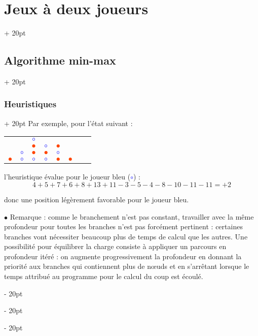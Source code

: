 \documentclass[a4paper, 12pt, twoside]{article}
\newcommand{\ind}[1][20pt]{\advance\leftskip + #1}
\newcommand{\deind}[1][20pt]{\advance\leftskip - #1}
\newenvironment{indt}[2][20pt]{#2 \par \ind[#1]}{\par \deind} %
\begin{document}
\begin{indt}{\section{Jeux à deux joueurs}}
\begin{indt}{\subsection{Algorithme min-max}}
\begin{indt}{\subsubsection{Heuristiques}}
                Par exemple, pour l'état suivant :
                \begin{center}
                    \begin{tabular}{|c|c|c|c|c|c|c|}
                        &
                        & \textcolor{blue}{$\circ$}
                        &&&&
                        \\
                        &
                        & \textcolor{ff4500}{$\bullet$}
                        & \textcolor{blue}{$\circ$}
                        & \textcolor{ff4500}{$\bullet$}
                        &&
                        \\
                        & \textcolor{blue}{$\circ$}
                        & \textcolor{ff4500}{$\bullet$}
                        & \textcolor{ff4500}{$\bullet$}
                        & \textcolor{blue}{$\circ$}
                        &&
                        \\
                        \textcolor{ff4500}{$\bullet$}
                        & \textcolor{blue}{$\circ$}
                        & \textcolor{blue}{$\circ$}
                        & \textcolor{blue}{$\circ$}
                        & \textcolor{ff4500}{$\bullet$}
                        & \textcolor{ff4500}{$\bullet$}
                        & $\phantom{\bullet}$
                        \\
                        \hline
                    \end{tabular}
                \end{center}

                l'heuristique évalue pour le joueur bleu (\textcolor{blue}{$\circ$}) :
                \[
                    4 + 5 + 7 + 6 + 8 + 13 + 11
                    - 3 - 5 - 4 - 8 - 10 - 11 - 11
                    = +2
                \]

                donc une position légèrement favorable pour le joueur bleu.

                \vspace{12pt}
                
                $\bullet$ Remarque : comme le branchement n'est pas constant, travailler avec la même profondeur pour toutes les branches n'est pas forcément pertinent : certaines branches vont nécessiter beaucoup plus de temps de calcul que les autres.
                Une possibilité pour équilibrer la charge consiste à appliquer un parcours en profondeur itéré : on augmente progressivement la profondeur en donnant la priorité aux branches qui contiennent plus de n\oe uds et en s'arrêtant lorsque le temps attribué au programme pour le calcul du coup est écoulé.
            \end{indt}


\end{indt}
\end{indt}
\end{document}
